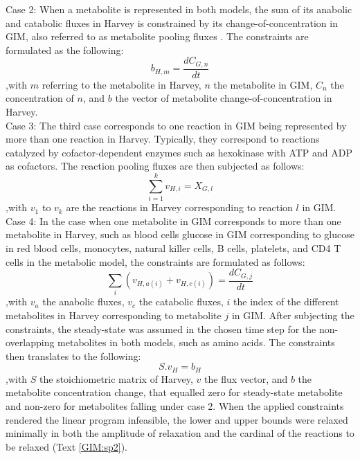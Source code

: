 Case 2: When a metabolite is represented in both models, the sum of its anabolic and catabolic fluxes in Harvey is constrained by its change-of-concentration in GIM, also referred to as metabolite pooling fluxes \cite{covert2008integrating}. The constraints are formulated as the following:
\begin{equation*}
b_{H,m}=\frac{dC_{G,n}}{dt}
\end{equation*}
,with $m$ referring to the metabolite in Harvey, $n$ the metabolite in GIM, $C_n$ the concentration of $n$, and $b$ the vector of metabolite change-of-concentration in Harvey. \\
Case 3: The third case corresponds to one reaction in GIM being represented by more than one reaction in Harvey. Typically, they correspond to reactions catalyzed by cofactor-dependent enzymes such as hexokinase with ATP and ADP as cofactors. The reaction pooling fluxes are then subjected as follows:
\begin{equation*}
\sum_{i=1}^{k} v_{H,i}=X_{G,l}
\end{equation*}
,with $v_1$ to $v_k$ are the reactions in Harvey corresponding to reaction $l$ in GIM. \\
Case 4: In the case when one metabolite in GIM corresponds to more than one metabolite in Harvey, such as blood cells glucose in GIM corresponding to glucose in red blood cells, monocytes, natural killer cells, B cells, platelets, and CD4 T cells in the metabolic model, the constraints are formulated as follows:
\begin{equation*}
\sum_{i} (v_{H,a(i)}+v_{H,c(i)})=\frac{dC_{G,j}}{dt}
\end{equation*}
,with $v_a$ the anabolic fluxes, $v_c$ the catabolic fluxes, $i$ the index of the different metabolites in Harvey corresponding to metabolite $j$ in GIM. 
After subjecting the constraints, the steady-state was assumed in the chosen time step for the non-overlapping metabolites in both models, such as amino acids. The constraints then translates to the following:
\begin{equation*}
S.v_{H}=b_{H}
\end{equation*}
,with $S$ the stoichiometric matrix of Harvey, $v$ the flux vector, and $b$ the metabolite concentration change, that equalled zero for steady-state metabolite and non-zero for metabolites falling under case 2. When the applied constraints rendered the linear program infeasible, the lower and upper bounds were relaxed minimally in both the amplitude of relaxation and the cardinal of the reactions to be relaxed (Text \ref{GIM:sp2}).\\
